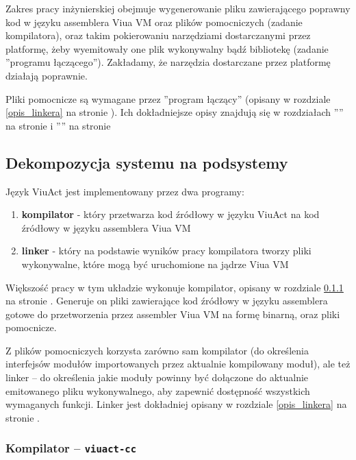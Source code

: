 \documentclass[11pt,oneside,a4paper,titlepage,onecolumn]{article}
\begin{document}
Zakres pracy inżynierskiej obejmuje wygenerowanie pliku zawierającego poprawny kod w języku
assemblera Viua VM oraz plików pomocniczych (zadanie kompilatora), oraz takim pokierowaniu
narzędziami dostarczanymi przez platformę, żeby wyemitowały one plik wykonywalny bądź bibliotekę (zadanie
''programu łączącego''). Zakładamy, że narzędzia dostarczane przez platformę działają poprawnie.

Pliki pomocnicze są wymagane przez ''program łączący'' (opisany w rozdziale \ref{opis_linkera} na stronie
\pageref{opis_linkera}). Ich dokładniejsze opisy znajdują się w rozdziałach
'''' na stronie \pageref{pliki_interfejsow_modulow} i
'''' na stronie \pageref{pliki_zaleznosci_modulow}

\subsection{Dekompozycja systemu na podsystemy}
\label{architektura_kompilatora_viuact}

Język ViuAct jest implementowany przez dwa programy:

\begin{enumerate}
    \item \textbf{kompilator} - który przetwarza kod źródłowy w języku ViuAct na kod źródłowy w języku
        assemblera Viua VM
    \item \textbf{linker} - który na podstawie wyników pracy kompilatora tworzy pliki wykonywalne, które
        mogą być uruchomione na jądrze Viua VM
\end{enumerate}

Większość pracy w tym układzie wykonuje kompilator, opisany w rozdziale \ref{opis_kompilatora} na stronie
\pageref{opis_kompilatora}. Generuje on pliki zawierające kod źródłowy w języku assemblera gotowe do
przetworzenia przez assembler Viua VM na formę binarną, oraz pliki pomocnicze.

Z plików pomocniczych korzysta zarówno sam kompilator (do określenia interfejsów modułów importowanych przez
aktualnie kompilowany moduł), ale też linker -- do określenia jakie moduły powinny być dołączone do aktualnie
emitowanego pliku wykonywalnego, aby zapewnić dostępność wszystkich wymaganych funkcji. Linker jest dokładniej
opisany w rozdziale \ref{opis_linkera} na stronie \pageref{opis_linkera}.

\subsubsection{Kompilator -- \texttt{viuact-cc}}
\label{opis_kompilatora}
\end{document}
